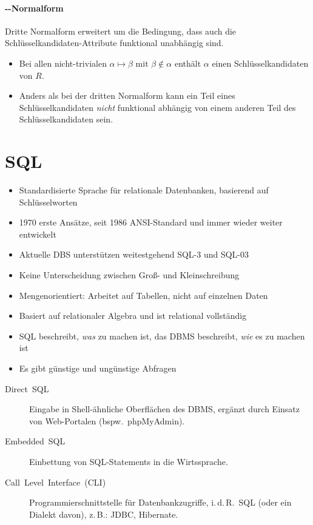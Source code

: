 \subsubsection{\protect{}-\protect{}-Normalform}

Dritte Normalform erweitert um die Bedingung, dass auch die Schlüsselkandidaten-Attribute
funktional unabhängig sind.
\begin{itemize}
\item Bei allen nicht-trivialen $\alpha\mapsto\beta$ mit $\beta\notin\alpha$
enthält $\alpha$ einen Schlüsselkandidaten von $R$.
\item Anders als bei der dritten Normalform kann ein Teil eines Schlüsselkandidaten
\emph{nicht} funktional abhängig von einem anderen Teil des Schlüsselkandidaten
sein.
\end{itemize}

\chapter{SQL}

\begin{itemize}
\item Standardisierte Sprache für relationale Datenbanken, basierend auf
Schlüsselworten
\item 1970 erste Ansätze, seit 1986 ANSI-Standard und immer wieder weiter
entwickelt
\item Aktuelle DBS unterstützen weitestgehend SQL-3 und SQL-03
\item Keine Unterscheidung zwischen Groß- und Kleinschreibung
\item Mengenorientiert: Arbeitet auf Tabellen, nicht auf einzelnen Daten
\item Basiert auf relationaler Algebra und ist relational vollständig
\item SQL beschreibt, \emph{was} zu machen ist, das DBMS beschreibt, \emph{wie}
es zu machen ist
\item Es gibt günstige und ungünstige Abfragen\end{itemize}
\begin{description}
\item [{Direct~SQL}] Eingabe in Shell-ähnliche Oberflächen des DBMS, ergänzt
durch Einsatz von Web-Portalen (bspw.~phpMyAdmin).
\item [{Embedded~SQL}] Einbettung von SQL-Statements in die Wirtssprache.
\item [{Call~Level~Interface~(CLI)}] Programmierschnittstelle für Datenbankzugriffe,
i.\,d.\,R.~SQL (oder ein Dialekt davon), z.\,B.: JDBC, Hibernate.
\end{description}

